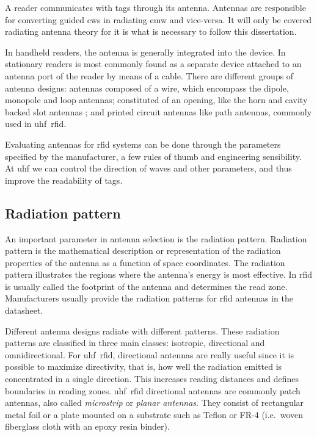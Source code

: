 A reader communicates with tags through its antenna. 
Antennas are responsible for converting guided \acp{cw} in radiating \ac{emw} and vice-versa.
It will only be covered radiating antenna theory for it is what is necessary to follow this dissertation.

In handheld readers, the antenna is generally integrated into the device. In stationary readers is most commonly found as a separate device attached to an antenna port of the reader by means of a cable.
There are different groups of antenna designs: antennas composed of a wire, which encompass the dipole, monopole and loop antennas; constituted of an opening, like the horn and cavity backed slot antennas %
; and printed circuit antennas like path antennas, commonly used in \acs{uhf}~\acs{rfid}.

Evaluating antennas for \ac{rfid} systems can be done through the parameters specified by the manufacturer, a few rules of thumb and engineering sensibility.
At \ac{uhf} we can control the direction of waves and other parameters, and thus improve the readability of tags.

\subsection{Radiation pattern}

An important parameter in antenna selection is the radiation pattern. 
Radiation pattern is the mathematical description or representation of the radiation properties of the antenna as a function of space coordinates.
The radiation pattern illustrates the regions where the antenna's energy is most effective.
In \ac{rfid} is usually called the footprint of the antenna and determines the read zone.
Manufacturers usually provide the radiation patterns for \ac{rfid} antennas in the datasheet.

Different antenna designs radiate with different patterns. These radiation patterns are classified in three main classes: isotropic, directional and omnidirectional.
For \acs{uhf}~\acs{rfid}, directional antennas are really useful since it is possible to maximize directivity, that is, how well the radiation emitted is concentrated in a single direction. This increases reading distances and defines boundaries in reading zones. \acs{uhf}~\acs{rfid} directional antennas are commonly patch antennas, also called \emph{microstrip} or \emph{planar antennas}. They consist of rectangular metal foil or a plate mounted on a substrate such as Teflon or FR-4 (i.e.\ woven fiberglass cloth with an epoxy resin binder).

